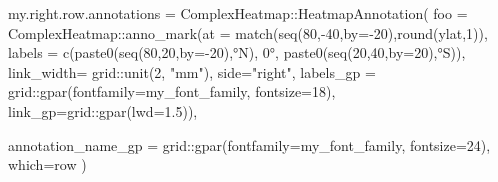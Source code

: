\documentclass[
]{article}
\newenvironment{Shaded}{\begin{snugshade}}{\end{snugshade}}
\newcommand{\AttributeTok}[1]{\textcolor[rgb]{0.77,0.63,0.00}{#1}}
\newcommand{\DecValTok}[1]{\textcolor[rgb]{0.00,0.00,0.81}{#1}}
\newcommand{\FloatTok}[1]{\textcolor[rgb]{0.00,0.00,0.81}{#1}}
\newcommand{\FunctionTok}[1]{\textcolor[rgb]{0.00,0.00,0.00}{#1}}
\newcommand{\NormalTok}[1]{#1}
\newcommand{\OtherTok}[1]{\textcolor[rgb]{0.56,0.35,0.01}{#1}}
\newcommand{\SpecialCharTok}[1]{\textcolor[rgb]{0.00,0.00,0.00}{#1}}
\newcommand{\StringTok}[1]{\textcolor[rgb]{0.31,0.60,0.02}{#1}}
\begin{document}
\begin{Shaded}
\begin{Highlighting}[]
\NormalTok{my.right.row.annotations }\OtherTok{=}\NormalTok{ ComplexHeatmap}\SpecialCharTok{::}\FunctionTok{HeatmapAnnotation}\NormalTok{(}
  \AttributeTok{foo =}\NormalTok{ ComplexHeatmap}\SpecialCharTok{::}\FunctionTok{anno\_mark}\NormalTok{(}\AttributeTok{at =} \FunctionTok{match}\NormalTok{(}\FunctionTok{seq}\NormalTok{(}\DecValTok{80}\NormalTok{,}\SpecialCharTok{{-}}\DecValTok{40}\NormalTok{,}\AttributeTok{by=}\SpecialCharTok{{-}}\DecValTok{20}\NormalTok{),}\FunctionTok{round}\NormalTok{(ylat,}\DecValTok{1}\NormalTok{)),}
                                  \AttributeTok{labels =} \FunctionTok{c}\NormalTok{(}\FunctionTok{paste0}\NormalTok{(}\FunctionTok{seq}\NormalTok{(}\DecValTok{80}\NormalTok{,}\DecValTok{20}\NormalTok{,}\AttributeTok{by=}\SpecialCharTok{{-}}\DecValTok{20}\NormalTok{),}\StringTok{\textquotesingle{}°N\textquotesingle{}}\NormalTok{),}
                                             \StringTok{\textquotesingle{}0°\textquotesingle{}}\NormalTok{,}
                                             \FunctionTok{paste0}\NormalTok{(}\FunctionTok{seq}\NormalTok{(}\DecValTok{20}\NormalTok{,}\DecValTok{40}\NormalTok{,}\AttributeTok{by=}\DecValTok{20}\NormalTok{),}\StringTok{\textquotesingle{}°S\textquotesingle{}}\NormalTok{)),}
                                  \AttributeTok{link\_width=}\NormalTok{ grid}\SpecialCharTok{::}\FunctionTok{unit}\NormalTok{(}\DecValTok{2}\NormalTok{, }\StringTok{"mm"}\NormalTok{),}
                                  \AttributeTok{side=}\StringTok{"right"}\NormalTok{,}
                                  \AttributeTok{labels\_gp =}\NormalTok{ grid}\SpecialCharTok{::}\FunctionTok{gpar}\NormalTok{(}\AttributeTok{fontfamily=}\NormalTok{my\_font\_family,}
                                                         \AttributeTok{fontsize=}\DecValTok{18}\NormalTok{),}
                                  \AttributeTok{link\_gp=}\NormalTok{grid}\SpecialCharTok{::}\FunctionTok{gpar}\NormalTok{(}\AttributeTok{lwd=}\FloatTok{1.5}\NormalTok{)),}

  \AttributeTok{annotation\_name\_gp =}\NormalTok{ grid}\SpecialCharTok{::}\FunctionTok{gpar}\NormalTok{(}\AttributeTok{fontfamily=}\NormalTok{my\_font\_family, }\AttributeTok{fontsize=}\DecValTok{24}\NormalTok{),}
  \AttributeTok{which=}\StringTok{\textquotesingle{}row\textquotesingle{}}
\NormalTok{)}
\end{Highlighting}
\end{Shaded}
\end{document}
